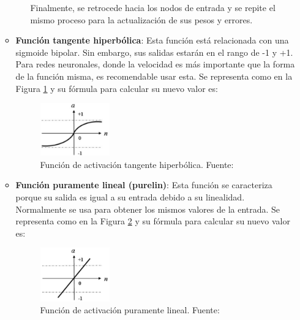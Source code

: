 \begin{itemize}
\begin{itemize}
\begin{itemize}
			Finalmente, se retrocede hacia los nodos de entrada y se repite el mismo proceso para la actualización de sus pesos y errores.
		\end{itemize}
	\item \textbf{Función tangente hiperbólica}: Esta función está relacionada con una sigmoide bipolar. Sin embargo, sus salidas estarán en el rango de -1 y +1. Para redes neuronales, donde la velocidad es más importante que la forma de la función misma, es recomendable usar esta. Se representa como en la Figura \ref{2:fig18} y su fórmula para calcular su nuevo valor es:
	\begin{figure}[h]
		\begin{center}
			\includegraphics[width=0.3\textwidth]{2/figures/hiperbolica.jpg}
			\caption{Función de activación tangente hiperbólica. Fuente: \cite{pr_dorofki2012ann}}
			\label{2:fig18}
		\end{center}
	\end{figure}
	
	\item \textbf{Función puramente lineal (purelin)}: Esta función se caracteriza porque su salida es igual a su entrada debido a su linealidad. Normalmente se usa para obtener los mismos valores de la entrada. Se representa como en la Figura \ref{2:fig19} y su fórmula para calcular su nuevo valor es:
	\begin{figure}[h]
		\begin{center}
			\includegraphics[width=0.3\textwidth]{2/figures/purelin.jpg}
			\caption{Función de activación puramente lineal. Fuente: \cite{pr_dorofki2012ann}}
			\label{2:fig19}
		\end{center}
	\end{figure}
	

\end{itemize}
\end{itemize}
